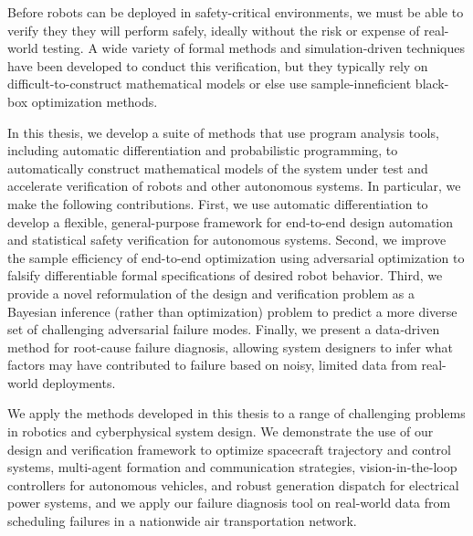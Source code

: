 %
%

Before robots can be deployed in safety-critical environments, we must be able to verify they they will perform safely, ideally without the risk or expense of real-world testing. A wide variety of formal methods and simulation-driven techniques have been developed to conduct this verification, but they typically rely on difficult-to-construct mathematical models or else use sample-inneficient black-box optimization methods.

In this thesis, we develop a suite of methods that use program analysis tools, including automatic differentiation and probabilistic programming, to automatically construct mathematical models of the system under test and accelerate verification of robots and other autonomous systems. In particular, we make the following contributions. First, we use automatic differentiation to develop a flexible, general-purpose framework for end-to-end design automation and statistical safety verification for autonomous systems. Second, we improve the sample efficiency of end-to-end optimization using adversarial optimization to falsify differentiable formal specifications of desired robot behavior. Third, we provide a novel reformulation of the design and verification problem as a Bayesian inference (rather than optimization) problem to predict a more diverse set of challenging adversarial failure modes. Finally, we present a data-driven method for root-cause failure diagnosis, allowing system designers to infer what factors may have contributed to failure based on noisy, limited data from real-world deployments.

We apply the methods developed in this thesis to a range of challenging problems in robotics and cyberphysical system design. We demonstrate the use of our design and verification framework to optimize spacecraft trajectory and control systems, multi-agent formation and communication strategies, vision-in-the-loop controllers for autonomous vehicles, and robust generation dispatch for electrical power systems, and we apply our failure diagnosis tool on real-world data from scheduling failures in a nationwide air transportation network.